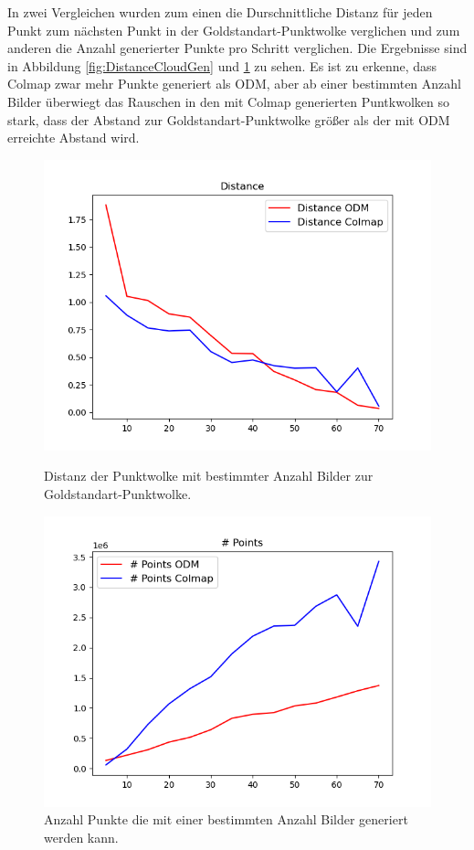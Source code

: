 \documentclass[12pt,titlepage, twoside]{article}
\begin{document}
In zwei Vergleichen wurden zum einen die Durschnittliche Distanz für jeden Punkt zum nächsten Punkt in der Goldstandart-Punktwolke verglichen und zum anderen die Anzahl generierter Punkte pro Schritt verglichen.
Die Ergebnisse sind in Abbildung \ref{fig:DistanceCloudGen} und \ref{fig:NPointsCloudGen} zu sehen. 
Es ist zu erkenne, dass Colmap zwar mehr Punkte generiert als ODM, aber ab einer bestimmten Anzahl Bilder überwiegt das Rauschen in den mit Colmap generierten Puntkwolken so stark, dass der Abstand zur Goldstandart-Punktwolke größer als der mit ODM erreichte Abstand wird.

\begin{figure}
    \centering
    \begin{minipage}{0.475\textwidth}
        \centering
        \includegraphics[width=1.0\textwidth]{./Images/DistanceCloudGen.png}
        \caption{Distanz der Punktwolke mit bestimmter Anzahl Bilder zur Goldstandart-Punktwolke.}
        \label{fig:DistanceCloudGen}
    \end{minipage}\hfill
    \begin{minipage}{0.475\textwidth}
        \centering
        \includegraphics[width=1.0\textwidth]{./Images/NPointsCloudGen.png}
        \caption{Anzahl Punkte die mit einer bestimmten Anzahl Bilder generiert werden kann.}
        \label{fig:NPointsCloudGen}
    \end{minipage}
\end{figure}
\end{document}
